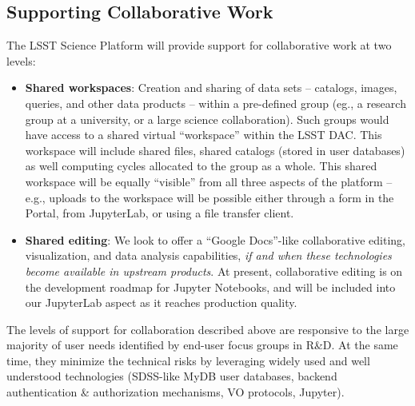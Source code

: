 \subsection{Supporting Collaborative Work\label{sec:collab}}

The LSST Science Platform will provide support for collaborative work at two levels:
\begin{itemize}
	\item \textbf{Shared workspaces}: Creation and sharing of data sets -- catalogs, images, queries, and other data products -- within a pre-defined group (eg., a research group at a university, or a large science collaboration). Such groups would have access to a shared virtual ``workspace'' within the LSST DAC. This workspace will include shared files, shared catalogs (stored in user databases) as well computing cycles allocated to the group as a whole. This shared workspace will be equally ``visible'' from all three aspects of the platform -- e.g., uploads to the workspace will be possible either through a form in the Portal, from JupyterLab, or using a file transfer client.

	\item \textbf{Shared editing}: We look to offer a ``Google Docs''-like collaborative editing, visualization, and data analysis capabilities, \emph{if and when these technologies become available in upstream products}. At present, collaborative editing is on the development roadmap for Jupyter  Notebooks, and will be included into our JupyterLab aspect as it reaches production quality.
\end{itemize}

The levels of support for collaboration described above are responsive to the large majority of user needs identified by end-user focus groups in R\&D. At the same time, they minimize the technical risks by leveraging widely used and well understood technologies (SDSS-like MyDB user databases, backend authentication \& authorization mechanisms, VO protocols, Jupyter).